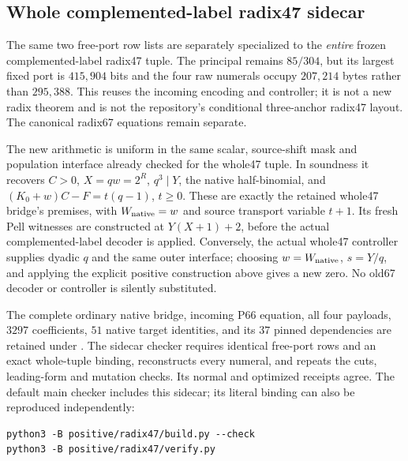 \subsection{Whole complemented-label radix47 sidecar}
The same two free-port row lists are separately specialized to the
\emph{entire} frozen complemented-label radix47 tuple.  The principal
remains \(85/304\), but its largest fixed port is \(415{,}904\) bits and
the four raw numerals occupy \(207{,}214\) bytes rather than \(295{,}388\).
This reuses the incoming encoding and controller; it is not a new radix
theorem and is not the repository's conditional three-anchor radix47 layout.
The canonical radix67 equations remain separate.

The new arithmetic is uniform in the same scalar, source-shift mask and
population interface already checked for the whole47 tuple.  In soundness
it recovers \(C>0\), \(X=qw=2^R\), \(q^3\mid Y\), the native
half-binomial, and \((K_0+w)C-F=t(q-1)\), \(t\ge0\).
These are exactly the retained whole47 bridge's premises, with
\(W_{\rm native}=w\) and source transport variable \(t+1\).
Its fresh Pell witnesses are constructed at \(Y(X+1)+2\), before the
actual complemented-label decoder is applied.  Conversely, the actual
whole47 controller supplies dyadic \(q\) and the same outer interface;
choosing \(w=W_{\rm native}\), \(s=Y/q\), and applying the explicit
positive construction above gives a new zero.  No old67 decoder or
controller is silently substituted.

The complete ordinary native bridge, incoming P66 equation, all four
payloads, \(3297\) coefficients, \(51\) native target identities, and its
\(37\) pinned dependencies are retained under
.  The sidecar checker requires identical
free-port rows and an exact whole-tuple binding, reconstructs every numeral,
and repeats the cuts, leading-form and mutation checks.  Its normal and
optimized receipts agree.  The default main checker includes this sidecar;
its literal binding can also be reproduced independently:
\begin{verbatim}
python3 -B positive/radix47/build.py --check
python3 -B positive/radix47/verify.py
\end{verbatim}

